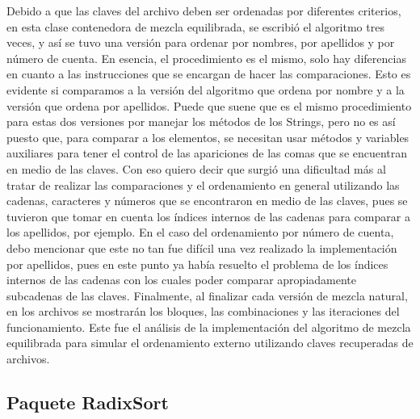 \documentclass[11pt]{article}
\begin{document}
Debido a que las claves del archivo deben ser ordenadas por diferentes criterios, en esta clase contenedora de mezcla equilibrada, se escribió el algoritmo tres veces, y así se tuvo una versión para ordenar por nombres, por apellidos y por número de cuenta. En esencia, el procedimiento es el mismo, solo hay diferencias en cuanto a las instrucciones que se encargan de hacer las comparaciones. Esto es evidente si comparamos a la versión del algoritmo que ordena por nombre y a la versión que ordena por apellidos. Puede que suene que es el mismo procedimiento para estas dos versiones por manejar los métodos de los Strings, pero no es así puesto que, para comparar a los elementos, se necesitan usar métodos y variables auxiliares para tener el control de las apariciones de las comas que se encuentran en medio de las claves. Con eso quiero decir que surgió una dificultad más al tratar de realizar las comparaciones y el ordenamiento en general utilizando las cadenas, caracteres y números que se encontraron en medio de las claves, pues se tuvieron que tomar en cuenta los índices internos de las cadenas para comparar a los apellidos, por ejemplo. En el caso del ordenamiento por número de cuenta, debo mencionar que este no tan fue difícil una vez realizado la implementación por apellidos, pues en este punto ya había resuelto el problema de los índices internos de las cadenas con los cuales poder comparar apropiadamente subcadenas de las claves. Finalmente, al finalizar cada versión de mezcla natural, en los archivos se mostrarán los bloques, las combinaciones y las iteraciones del funcionamiento. Este fue el análisis de la implementación del algoritmo de mezcla equilibrada para simular el ordenamiento externo utilizando claves recuperadas de archivos.


\subsection{Paquete RadixSort}
\end{document}
